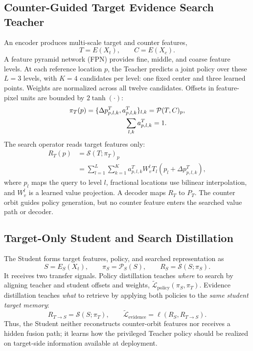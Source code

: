 \subsection{Counter-Guided Target Evidence Search Teacher}
An encoder produces multi-scale target and counter features,
\begin{equation}
T=E(X_t), \qquad C=E(X_c).
\label{eq:teacher_features}
\end{equation}
A feature pyramid network (FPN) provides fine, middle, and coarse feature levels. At each reference location $p$, the Teacher predicts a joint policy over these $L=3$ levels, with $K=4$ candidates per level: one fixed center and three learned points. Weights are normalized across all twelve candidates. Offsets in feature-pixel units are bounded by $2\tanh(\cdot)$:
\begin{equation}
\begin{aligned}
\pi_T(p)&=\{\Delta p^T_{p,l,k},a^T_{p,l,k}\}_{l,k}=\mathcal{P}(T,C)_p,\\
&\hspace{20mm}\sum_{l,k} a^T_{p,l,k}=1.
\end{aligned}
\label{eq:teacher_policy}
\end{equation}
The search operator reads target features only:
\begin{equation}
\begin{aligned}
R_T(p)&=\mathcal{S}(T;\pi_T)_p\\
&=\sum_{l=1}^{L}\sum_{k=1}^{K}a^T_{p,l,k}W_v^{l}T_l(p_l+\Delta p^T_{p,l,k}),
\end{aligned}
\label{eq:teacher_search}
\end{equation}
where $p_l$ maps the query to level $l$, fractional locations use bilinear interpolation, and $W_v^l$ is a learned value projection. A decoder maps $R_T$ to $P_T$. The counter orbit guides policy generation, but no counter feature enters the searched value path or decoder.

\subsection{Target-Only Student and Search Distillation}
The Student forms target features, policy, and searched representation as
\begin{equation}
S=E_S(X_t), \qquad \pi_S=\mathcal{P}_S(S), \qquad R_S=\mathcal{S}(S;\pi_S).
\label{eq:student_search}
\end{equation}
It receives two transfer signals. Policy distillation teaches \emph{where} to search by aligning teacher and student offsets and weights, $\widetilde{\mathcal{L}}_{\mathrm{policy}}(\pi_S,\pi_T)$. Evidence distillation teaches \emph{what} to retrieve by applying both policies to the \emph{same student target memory}:
\begin{equation}
R_{T\rightarrow S}=\mathcal{S}(S;\pi_T), \qquad
\widetilde{\mathcal{L}}_{\mathrm{evidence}}=\ell(R_S,R_{T\rightarrow S}).
\label{eq:shared_memory}
\end{equation}
Thus, the Student neither reconstructs counter-orbit features nor receives a hidden fusion path; it learns how the privileged Teacher policy should be realized on target-side information available at deployment.

